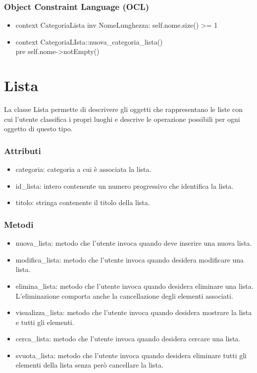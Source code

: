 \documentclass[a4paper,12pt]{article}
\begin{document}
\subsubsection*{Object Constraint Language (OCL)}
\begin{itemize}
\item {\ttfamily context CategoriaLista inv NomeLunghezza: self.nome.size() >= 1}
\item {\ttfamily context CategoriaLIsta::nuova\_categoria\_lista() \\pre self.nome->notEmpty()}

\end{itemize}
\section{Lista}

La classe {\sffamily Lista} permette di descrivere gli oggetti che rappresentano le liste con cui l'utente classifica i propri luoghi e descrive le operazione possibili per ogni oggetto di questo tipo.
\subsubsection*{Attributi}
\begin{itemize} \setlength\itemsep{0.01em}
\item {\ttfamily categoria}: categoria a cui è associata la lista.
\item {\ttfamily id\_lista}: intero contenente un numero progressivo che identifica la lista.
\item {\ttfamily titolo}: stringa contenente il titolo della lista.
\end{itemize}
\subsubsection*{Metodi}
\begin{itemize} \setlength\itemsep{0.01em}
\item {\ttfamily nuova\_lista}: metodo che l'utente invoca quando deve inserire una nuova lista. 
\item {\ttfamily modifica\_lista}: metodo che l'utente invoca quando desidera modificare una lista.
\item {\ttfamily elimina\_lista}: metodo che l'utente invoca quando desidera eliminare una lista. L'eliminazione comporta anche la cancellazione degli elementi associati.
\item {\ttfamily visualizza\_lista}: metodo che l'utente invoca quando desidera mostrare la lista e tutti gli elementi.
\item {\ttfamily cerca\_lista}: metodo che l'utente invoca quando desidera cercare una lista. 
\item {\ttfamily svuota\_lista}: metodo che l'utente invoca quando desidera eliminare tutti gli elementi della lista senza però cancellare la lista. 
\end{itemize}
\end{document}
